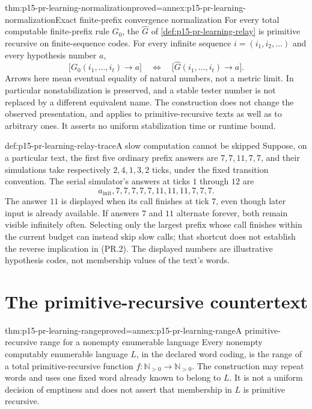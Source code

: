 \begin{hbtheorem}{thm:p15-pr-learning-normalization}{proved=annex:p15-pr-learning-normalization}{Exact finite-prefix convergence normalization}
For every total computable finite-prefix rule \(G_0\), the
\(\widehat G\) of \cref{def:p15-pr-learning-relay} is primitive
recursive on finite-sequence codes. For every infinite sequence
\(i=(i_1,i_2,\ldots)\) and every hypothesis number \(a\),
\[
 \bigl[G_0(i_1,\ldots,i_t)\longrightarrow a\bigr]
 \quad\Longleftrightarrow\quad
 \bigl[\widehat G(i_1,\ldots,i_t)\longrightarrow a\bigr].
 \tag{PR.2}
\]
Arrows here mean eventual equality of natural numbers, not a metric
limit. In particular nonstabilization is preserved, and a stable
tester number is not replaced by a different equivalent name.
The construction does not change the observed presentation,
and applies to primitive-recursive texts as well as to arbitrary
ones. It asserts no uniform stabilization time or runtime bound.
\end{hbtheorem}

\begin{hbexample}{def:p15-pr-learning-relay-trace}{A slow computation cannot be skipped}
Suppose, on a particular text, the first five ordinary prefix
answers are \(7,7,11,7,7\), and their simulations take respectively
\(2,4,1,3,2\) ticks, under the fixed transition convention.
The serial simulator's answers at ticks \(1\) through \(12\) are
\[
 a_{\mathrm{init}},7,7,7,7,7,11,11,11,7,7,7.
\]
The answer \(11\) is displayed when its call finishes at tick \(7\),
even though later input is already available.
If answers \(7\) and \(11\) alternate forever, both remain visible
infinitely often. Selecting only the largest prefix whose call
finishes within the current budget can instead skip slow calls;
that shortcut does not establish the reverse implication in (PR.2).
The displayed numbers are illustrative hypothesis codes, not
membership values of the text's words.
\end{hbexample}

\section{The primitive-recursive countertext}
\label{sec:p15-pr-learning-countertext}

\begin{hblemma}{thm:p15-pr-learning-range}{proved=annex:p15-pr-learning-range}{A primitive-recursive range for a nonempty enumerable language}
Every nonempty computably enumerable language \(L\), in the declared
word coding, is the range of a total primitive-recursive function
\(f:\mathbb N_{>0}\to\mathbb N_{>0}\).
The construction may repeat words and uses one fixed word already
known to belong to \(L\). It is not a uniform decision of emptiness
and does not assert that membership in \(L\) is primitive recursive.
\end{hblemma}


